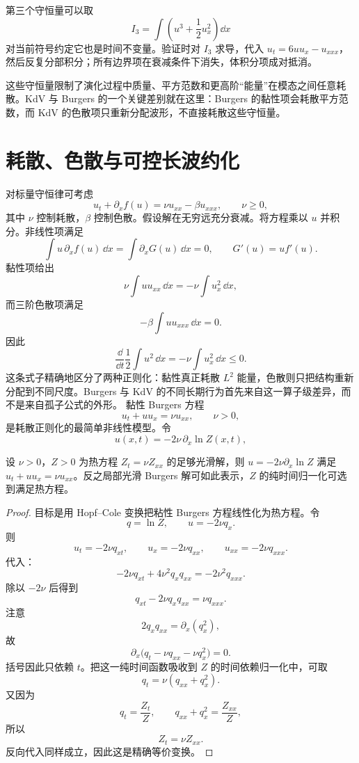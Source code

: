 第三个守恒量可以取
\begin{equation*}{
I_3=\int\left(u^3+\frac12u_x^2\right)\dd x
}\end{equation*}
对当前符号约定它也是时间不变量。验证时对 $I_3$ 求导，代入 $u_t=6uu_x-u_{xxx}$，然后反复分部积分；所有边界项在衰减条件下消失，体积分项成对抵消。

这些守恒量限制了演化过程中质量、平方范数和更高阶“能量”在模态之间任意耗散。KdV 与 Burgers 的一个关键差别就在这里：Burgers 的黏性项会耗散平方范数，而 KdV 的色散项只重新分配波形，不直接耗散这些守恒量。

\section{耗散、色散与可控长波约化}
\label{sec:dissipative-dispersive-regularization}
对标量守恒律可考虑
\begin{equation*}u_t+\partial_x f(u)
=\nu u_{xx}-\beta u_{xxx},
\qquad
\nu\ge0,\end{equation*}
其中 $\nu$ 控制耗散，$\beta$ 控制色散。假设解在无穷远充分衰减。将方程乘以 $u$ 并积分。非线性项满足
\[
\int u\,\partial_xf(u)\,\dd x
=
\int\partial_xG(u)\,\dd x=0,
\qquad
G'(u)=u f'(u).
\]
黏性项给出
\[
\nu\int u u_{xx}\,\dd x
=-\nu\int u_x^2\,\dd x,
\]
而三阶色散项满足
\[
-\beta\int u u_{xxx}\,\dd x=0.
\]
因此
\begin{equation*}\frac{\dd}{\dd t}
\frac12\int u^2\,\dd x
=-\nu\int u_x^2\,\dd x\le0.\end{equation*}
这条式子精确地区分了两种正则化：黏性真正耗散 $L^2$ 能量，色散则只把结构重新分配到不同尺度。Burgers 与 KdV 的不同长期行为首先来自这一算子级差异，而不是来自孤子公式的外形。
黏性 Burgers 方程
\begin{equation}
u_t+u u_x=\nu u_{xx},
\qquad \nu>0,
\label{eq:viscous-burgers}
\end{equation}
是耗散正则化的最简单非线性模型。令
\begin{equation}
u(x,t)=-2\nu\,\partial_x\ln Z(x,t),
\label{eq:hopf-cole-substitution}
\end{equation}

\begin{proposition}
设 $\nu>0$，$Z>0$ 为热方程 $Z_t=\nu Z_{xx}$ 的足够光滑解，则 $u=-2\nu\partial_x\ln Z$ 满足 $u_t+uu_x=\nu u_{xx}$。反之局部光滑 Burgers 解可如此表示，$Z$ 的纯时间归一化可选到满足热方程。
\end{proposition}
\begin{proof}
目标是用 Hopf--Cole 变换把粘性 Burgers 方程线性化为热方程。令
\[
q=\ln Z,
\qquad
u=-2\nu q_x.
\]
则
\[
u_t=-2\nu q_{xt},
\qquad
u_x=-2\nu q_{xx},
\qquad
u_{xx}=-2\nu q_{xxx}.
\]
代入：
\[
-2\nu q_{xt}
+4\nu^2q_xq_{xx}
=-2\nu^2q_{xxx}.
\]
除以 $-2\nu$ 后得到
\[
q_{xt}-2\nu q_xq_{xx}
=\nu q_{xxx}.
\]
注意
\[
2q_xq_{xx}=\partial_x(q_x^2),
\]
故
\[
\partial_x
\bigl(q_t-\nu q_{xx}-\nu q_x^2\bigr)=0.
\]
括号因此只依赖 $t$。把这一纯时间函数吸收到 $Z$ 的时间依赖归一化中，可取
\[
q_t=\nu(q_{xx}+q_x^2).
\]
又因为
\[
q_t=\frac{Z_t}{Z},
\qquad
q_{xx}+q_x^2=\frac{Z_{xx}}{Z},
\]
所以
\[
Z_t=\nu Z_{xx}.
\]
反向代入同样成立，因此这是精确等价变换。
\end{proof}

